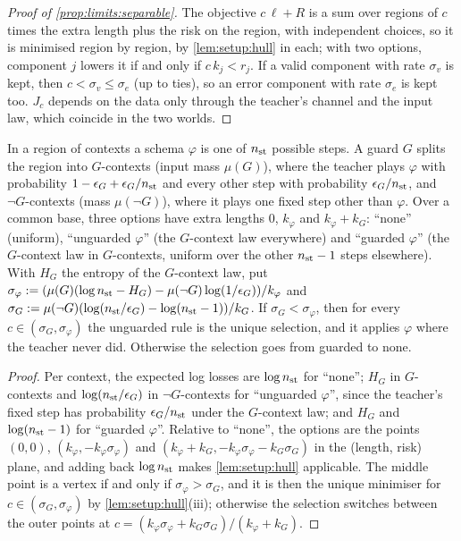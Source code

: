 \begin{proof}[Proof of \cref{prop:limits:separable}]
The objective $c\,\ell+R$ is a sum over regions of $c$ times the extra length plus the risk on the region, with independent choices, so it is minimised region by region, by \cref{lem:setup:hull} in each; with two options, component $j$ lowers it if and only if $c\,k_j<r_j$. If a valid component with rate $\sigma_v$ is kept, then $c<\sigma_v\le\sigma_e$ (up to ties), so an error component with rate $\sigma_e$ is kept too. $J_c$ depends on the data only through the teacher's channel and the input law, which coincide in the two worlds.
\end{proof}

\begin{proposition}\label{prop:limits:guard}
In a region of contexts a schema $\varphi$ is one of $n_{\rm st}$ possible steps. A guard $G$ splits the region into $G$-contexts (input mass $\mu(G)$), where the teacher plays $\varphi$ with probability $1-\epsilon_G+\epsilon_G/n_{\rm st}$ and every other step with probability $\epsilon_G/n_{\rm st}$, and $\neg G$-contexts (mass $\mu(\neg G)$), where it plays one fixed step other than $\varphi$. Over a common base, three options have extra lengths $0$, $k_\varphi$ and $k_\varphi+k_G$: ``none'' (uniform), ``unguarded $\varphi$'' (the $G$-context law everywhere) and ``guarded $\varphi$'' (the $G$-context law in $G$-contexts, uniform over the other $n_{\rm st}-1$ steps elsewhere). With $H_G$ the entropy of the $G$-context law, put $\sigma_\varphi:=(\mu(G)(\log n_{\rm st}-H_G)-\mu(\neg G)\log(1/\epsilon_G))/k_\varphi$ and $\sigma_G:=\mu(\neg G)(\log(n_{\rm st}/\epsilon_G)-\log(n_{\rm st}-1))/k_G$. If $\sigma_G<\sigma_\varphi$, then for every $c\in(\sigma_G,\sigma_\varphi)$ the unguarded rule is the unique selection, and it applies $\varphi$ where the teacher never did. Otherwise the selection goes from guarded to none.
\end{proposition}

\begin{proof}
Per context, the expected log losses are $\log n_{\rm st}$ for ``none''; $H_G$ in $G$-contexts and $\log(n_{\rm st}/\epsilon_G)$ in $\neg G$-contexts for ``unguarded $\varphi$'', since the teacher's fixed step has probability $\epsilon_G/n_{\rm st}$ under the $G$-context law; and $H_G$ and $\log(n_{\rm st}-1)$ for ``guarded $\varphi$''. Relative to ``none'', the options are the points $(0,0)$, $(k_\varphi,-k_\varphi\sigma_\varphi)$ and $(k_\varphi+k_G,-k_\varphi\sigma_\varphi-k_G\sigma_G)$ in the (length, risk) plane, and adding back $\log n_{\rm st}$ makes \cref{lem:setup:hull} applicable. The middle point is a vertex if and only if $\sigma_\varphi>\sigma_G$, and it is then the unique minimiser for $c\in(\sigma_G,\sigma_\varphi)$ by \cref{lem:setup:hull}(iii); otherwise the selection switches between the outer points at $c=(k_\varphi\sigma_\varphi+k_G\sigma_G)/(k_\varphi+k_G)$.
\end{proof}

